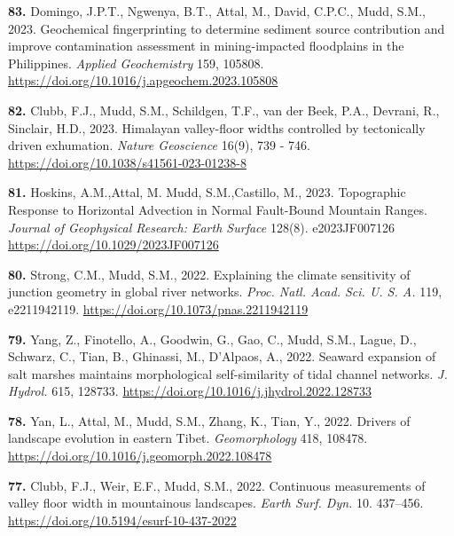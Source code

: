 \documentclass[10pt, a4paper]{article}
\newcommand{\years}[1]{\marginnote{\scriptsize #1}}
\begin{document}
\years{2023}\hangindent=0.7cm\textbf{83. }Domingo, J.P.T., Ngwenya, B.T., Attal, M., David, C.P.C., Mudd, S.M., 2023. Geochemical fingerprinting to determine sediment source contribution and improve contamination assessment in mining-impacted floodplains in the Philippines. \textit{Applied Geochemistry} 159, 105808.   \href{https://doi.org/10.1016/j.apgeochem.2023.105808}{https://doi.org/10.1016/j.apgeochem.2023.105808}\par
\years{2023}\hangindent=0.7cm\textbf{82. }Clubb, F.J., Mudd, S.M., Schildgen, T.F., van der Beek, P.A., Devrani, R., Sinclair, H.D., 2023. Himalayan valley-floor widths controlled by tectonically driven exhumation. \textit{Nature Geoscience} 16(9), 739 - 746. \href{https://doi.org/10.1038/s41561-023-01238-8}{https://doi.org/10.1038/s41561-023-01238-8}\par
\years{2023}\hangindent=0.7cm\textbf{81. }Hoskins, A.M.,Attal, M. Mudd, S.M.,Castillo, M., 2023. Topographic Response to Horizontal Advection in Normal Fault-Bound Mountain Ranges. \textit{Journal of Geophysical Research: Earth Surface} 128(8). e2023JF007126 \href{https://doi.org/10.1029/2023JF007126}{https://doi.org/10.1029/2023JF007126}\par

\years{2022}\hangindent=0.7cm\textbf{80. }Strong, C.M., Mudd, S.M., 2022. Explaining the climate sensitivity of junction geometry in global river networks. \textit{Proc. Natl. Acad. Sci. U. S. A.} 119, e2211942119. \href{https://doi.org/10.1073/pnas.2211942119}{https://doi.org/10.1073/pnas.2211942119}\par  
\years{2022}\hangindent=0.7cm\textbf{79. }Yang, Z., Finotello, A., Goodwin, G., Gao, C., Mudd, S.M., Lague, D., Schwarz, C., Tian, B., Ghinassi, M., D’Alpaos, A., 2022. Seaward expansion of salt marshes maintains morphological self-similarity of tidal channel networks. \textit{J. Hydrol.} 615, 128733.   \href{https://doi.org/10.1016/j.jhydrol.2022.128733}{https://doi.org/10.1016/j.jhydrol.2022.128733}\par
\years{2022}\hangindent=0.7cm\textbf{78. }Yan, L., Attal, M., Mudd, S.M., Zhang, K., Tian, Y., 2022. Drivers of landscape evolution in eastern Tibet. \textit{Geomorphology} 418, 108478. \href{https://doi.org/10.1016/j.geomorph.2022.108478}{https://doi.org/10.1016/j.geomorph.2022.108478}\par
\years{2022}\hangindent=0.7cm\textbf{77. }Clubb, F.J., Weir, E.F., Mudd, S.M., 2022. Continuous measurements of valley floor width in mountainous landscapes. \textit{Earth Surf. Dyn.} 10. 437–456. \href{https://doi.org/10.5194/esurf-10-437-2022}{https://doi.org/10.5194/esurf-10-437-2022}\par
\end{document}
